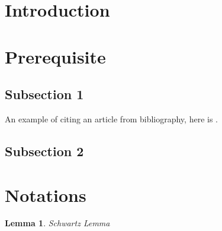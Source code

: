 \documentclass[reqno]{amsart}
\numberwithin{equation}{section}
\theoremstyle{plain}
\newtheorem{lemma}[theorem]{Lemma}
\theoremstyle{definition}
\theoremstyle{definition}
\begin{document}
\maketitle


\section{Introduction}

 
\section{Prerequisite}

    \subsection{Subsection 1} An example of citing an article from bibliography, here is \cite{calling_card_1}.

    \subsection{Subsection 2}

\section{Notations}
\begin{lemma}\label{schwartz_lemma}
    Schwartz Lemma
\end{lemma}
\end{document}
